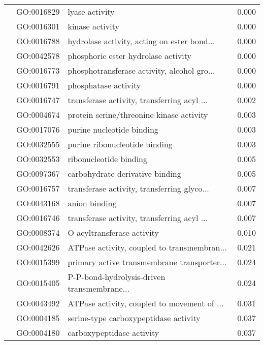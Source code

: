\begin{longtable}{lllr}
   & GO:0016829 &                               lyase activity &         0.000 \\
   & GO:0016301 &                              kinase activity &         0.000 \\
   & GO:0016788 &  hydrolase activity, acting on ester bond... &         0.000 \\
   & GO:0042578 &          phosphoric ester hydrolase activity &         0.000 \\
   & GO:0016773 &  phosphotransferase activity, alcohol gro... &         0.000 \\
   & GO:0016791 &                         phosphatase activity &         0.000 \\
   & GO:0016747 &  transferase activity, transferring acyl ... &         0.002 \\
   & GO:0004674 &     protein serine/threonine kinase activity &         0.003 \\
   & GO:0017076 &                    purine nucleotide binding &         0.003 \\
   & GO:0032555 &                purine ribonucleotide binding &         0.003 \\
   & GO:0032553 &                       ribonucleotide binding &         0.005 \\
   & GO:0097367 &              carbohydrate derivative binding &         0.005 \\
   & GO:0016757 &  transferase activity, transferring glyco... &         0.007 \\
   & GO:0043168 &                                anion binding &         0.007 \\
   & GO:0016746 &  transferase activity, transferring acyl ... &         0.007 \\
   & GO:0008374 &                   O-acyltransferase activity &         0.010 \\
   & GO:0042626 &  ATPase activity, coupled to transmembran... &         0.021 \\
   & GO:0015399 &  primary active transmembrane transporter... &         0.024 \\
   & GO:0015405 &  P-P-bond-hydrolysis-driven transmembrane... &         0.024 \\
   & GO:0043492 &  ATPase activity, coupled to movement of ... &         0.031 \\
   & GO:0004185 &        serine-type carboxypeptidase activity &         0.037 \\
   & GO:0004180 &                    carboxypeptidase activity &         0.037 \\

\end{longtable}
